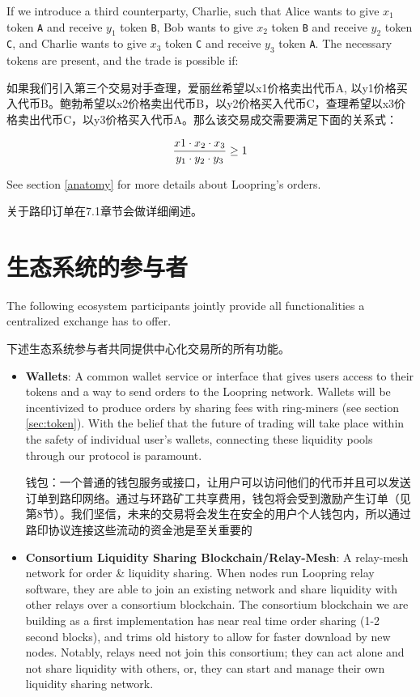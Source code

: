 \documentclass[UTF8,nofonts]{ctexart}
\begin{document}
\begin{multicols}{2}
If we introduce a third counterparty, Charlie, such that  Alice wants to give $x_1$ token \verb|A| and receive $y_1$ token \verb|B|, Bob wants to give $x_2$ token \verb|B| and receive $y_2$ token \verb|C|, and Charlie wants to give $x_3$ token \verb|C| and receive $y_3$ token \verb|A|. The necessary tokens are present, and the trade is possible if:

 如果我们引入第三个交易对手查理，爱丽丝希望以x1价格卖出代币A, 以y1价格买入代币B。鲍勃希望以x2价格卖出代币B，以y2价格买入代币C，查理希望以x3价格卖出代币C，以y3价格买入代币A。那么该交易成交需要满足下面的关系式：


\begin{equation}
{{x1 \cdot x_2 \cdot x_3 \over y_1 \cdot y_2 \cdot y_3} \geq 1}
\end{equation}


See section \ref{anatomy} for more details about Loopring's orders.

关于路印订单在7.1章节会做详细阐述。


\section{生态系统的参与者\label{sec:ecosystem}}
The following ecosystem participants jointly provide all functionalities a centralized exchange has to offer. 

下述生态系统参与者共同提供中心化交易所的所有功能。

\begin{itemize}

\item \textbf{Wallets}: A common wallet service or interface that gives users access to their tokens and a way to send orders to the Loopring network. Wallets will be incentivized to produce orders by sharing fees with ring-miners (see section \ref{sec:token}). With the belief that the future of trading will take place within the safety of individual user's wallets, connecting these liquidity pools through our protocol is paramount.

钱包：一个普通的钱包服务或接口，让用户可以访问他们的代币并且可以发送订单到路印网络。通过与环路矿工共享费用，钱包将会受到激励产生订单（见第8节）。我们坚信，未来的交易将会发生在安全的用户个人钱包内，所以通过路印协议连接这些流动的资金池是至关重要的


\item \textbf{Consortium Liquidity Sharing Blockchain/Relay-Mesh}: A relay-mesh network for order \& liquidity sharing. When nodes run Loopring relay software, they are able to join an existing network and share liquidity with other relays over a consortium blockchain. The consortium blockchain we are building as a first implementation has near real time order sharing (1-2 second blocks), and trims old history to allow for faster download by new nodes. Notably, relays need not join this consortium; they can act alone and not share liquidity with others, or, they can start and manage their own liquidity sharing network.


\end{itemize}
\end{multicols}
\end{document}
